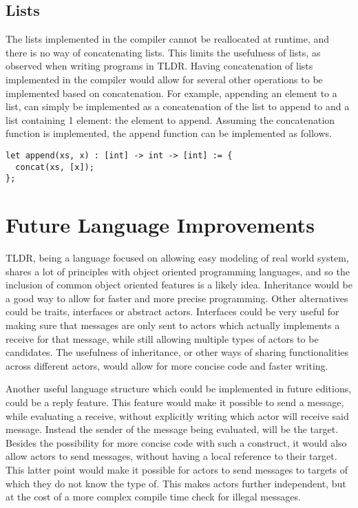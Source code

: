 \subsection{Lists}

The lists implemented in the compiler cannot be reallocated at runtime, and there is no way of concatenating lists. This limits the usefulness of lists, as observed when writing programs in TLDR. Having concatenation of lists implemented in the compiler would allow for several other operations to be implemented based on concatenation. For example, appending an element to a list, can simply be implemented as a concatenation of the list to append to and a list containing 1 element: the element to append. Assuming the concatenation function is implemented, the append function can be implemented as follows.

\begin{lstlisting}[caption = {Implementation of the append function based on the concatenation function.}]
let append(xs, x) : [int] -> int -> [int] := {
  concat(xs, [x]);
};
\end{lstlisting}

\section{Future Language Improvements}

TLDR, being a language focused on allowing easy modeling of real world system, shares a lot of principles with object oriented programming languages, and so the inclusion of common object oriented features is a likely idea. Inheritance would be a good way to allow for faster and more precise programming. Other alternatives could be traits, interfaces or abstract actors. Interfaces could be very useful for making sure that messages are only sent to actors which actually implements a receive for that message, while still allowing multiple types of actors to be candidates. The usefulness of inheritance, or other ways of sharing functionalities across different actors, would allow for more concise code and faster writing.

Another useful language structure which could be implemented in future editions, could be a reply feature. This feature would make it possible to send a message, while evaluating a receive, without explicitly writing which actor will receive said message. Instead the sender of the message being evaluated, will be the target. Besides the possibility for more concise code with such a construct, it would also allow actors to send messages, without having a local reference to their target. This latter point would make it possible for actors to send messages to targets of which they do not know the type of. This makes actors further independent, but at the cost of a more complex compile time check for illegal messages.

